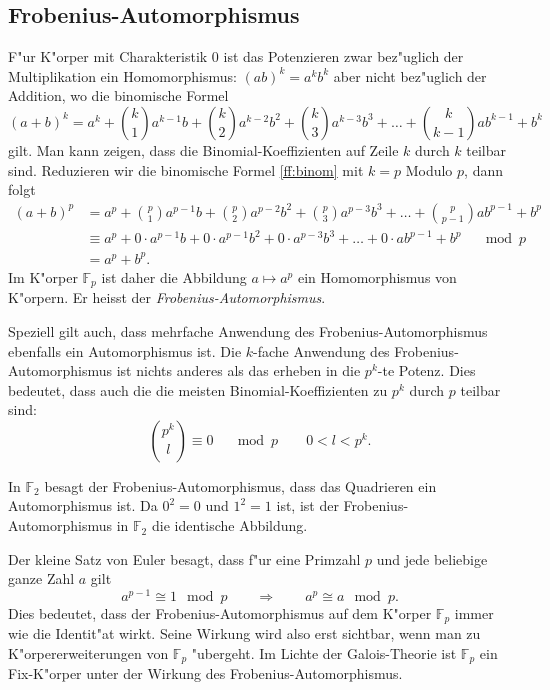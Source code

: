 \subsection{Frobenius-Automorphismus}
F"ur K"orper mit Charakteristik $0$ ist das Potenzieren zwar bez"uglich der
Multiplikation ein Homomorphismus:
$
(ab)^k = a^kb^k
$
aber nicht bez"uglich der Addition, wo die binomische Formel
\begin{equation}
(a+b)^k
= 
a^k + \binom{k}{1} a^{k-1}b + \binom{k}{2} a^{k-2}b^2
+ \binom{k}{3}a^{k-3}b^3 + \dots + \binom{k}{k-1}ab^{k-1} + b^k
\label{ff:binom}
\end{equation}
gilt.
Man kann zeigen, dass die Binomial-Koeffizienten auf Zeile $k$ durch 
$k$ teilbar sind.
Reduzieren wir die binomische Formel \eqref{ff:binom} mit $k=p$ Modulo $p$,
dann folgt
\begin{align*}
(a+b)^p
&= 
a^p + \binom{p}{1} a^{p-1}b + \binom{p}{2} a^{p-2}b^2
+ \binom{p}{3}a^{p-3}b^3 + \dots + \binom{p}{p-1}ab^{p-1} + b^p
\\
&\equiv
a^p + 0\cdot a^{p-1}b + 0\cdot a^{p-1}b^2
+ 0\cdot a^{p-3}b^3 + \dots + 0\cdot ab^{p-1} + b^p
\quad\mod p
\\
&=
a^p + b^p.
\end{align*}
Im K"orper $\mathbb F_p$ ist daher die Abbildung $a\mapsto a^p$
ein Homomorphismus von K"orpern.
Er heisst der {\em Frobenius-Automorphismus}.

Speziell gilt auch, dass mehrfache Anwendung des Frobenius-Automorphismus
ebenfalls ein Automorphismus ist.
Die $k$-fache Anwendung des Frobenius-Automorphismus ist nichts anderes
als das erheben in die $p^k$-te Potenz.
Dies bedeutet, dass auch die die meisten Binomial-Koeffizienten zu $p^k$ 
durch $p$ teilbar sind:
\[
\binom{p^k}{l}\equiv 0\quad\mod p
\qquad
0<l<p^k.
\]

\begin{beispiel}
In $\mathbb F_2$ besagt der Frobenius-Automorphismus, dass das Quadrieren
ein Automorphismus ist.
Da $0^2=0$ und $1^2=1$ ist, ist der Frobenius-Automorphismus in $\mathbb F_2$
die identische Abbildung.
\end{beispiel}

Der kleine Satz von Euler besagt, dass f"ur eine Primzahl $p$ und jede
beliebige ganze Zahl $a$ gilt
\[
a^{p-1}\cong 1\mod p
\qquad\Rightarrow\qquad
a^p\cong a\mod p.
\]
Dies bedeutet, dass der Frobenius-Automorphismus auf dem K"orper $\mathbb F_p$
immer wie die Identit"at wirkt.
Seine Wirkung wird also erst sichtbar, wenn man zu K"orpererweiterungen
von $\mathbb F_p$ "ubergeht.
Im Lichte der Galois-Theorie ist $\mathbb F_p$ ein Fix-K"orper
unter der Wirkung des Frobenius-Automorphismus.

